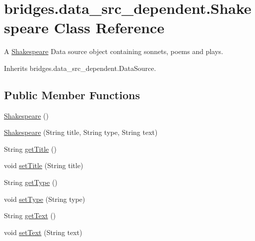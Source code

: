 \hypertarget{classbridges_1_1data__src__dependent_1_1_shakespeare}{}\section{bridges.\+data\+\_\+src\+\_\+dependent.\+Shakespeare Class Reference}
\label{classbridges_1_1data__src__dependent_1_1_shakespeare}


A \mbox{\hyperlink{classbridges_1_1data__src__dependent_1_1_shakespeare}{Shakespeare}} Data source object containing sonnets, poems and plays.  




Inherits bridges.\+data\+\_\+src\+\_\+dependent.\+Data\+Source.

\subsection*{Public Member Functions}
\begin{DoxyCompactItemize}
\item 
\mbox{\hyperlink{classbridges_1_1data__src__dependent_1_1_shakespeare_a34d92b817c4073000de003362e3003fa}{Shakespeare}} ()
\item 
\mbox{\hyperlink{classbridges_1_1data__src__dependent_1_1_shakespeare_aa5a5390d6f7afe3d63f4ad7f9779f9e9}{Shakespeare}} (String title, String type, String text)
\item 
String \mbox{\hyperlink{classbridges_1_1data__src__dependent_1_1_shakespeare_a0f045c5d1140414b7ad6ad5511e6e79c}{get\+Title}} ()
\item 
void \mbox{\hyperlink{classbridges_1_1data__src__dependent_1_1_shakespeare_a2687017aca35bb26b148f784a0bff732}{set\+Title}} (String title)
\item 
String \mbox{\hyperlink{classbridges_1_1data__src__dependent_1_1_shakespeare_adbbb48b9e2564ae910e0313dd88542fd}{get\+Type}} ()
\item 
void \mbox{\hyperlink{classbridges_1_1data__src__dependent_1_1_shakespeare_afcee18014d5630a0a15701635005bea2}{set\+Type}} (String type)
\item 
String \mbox{\hyperlink{classbridges_1_1data__src__dependent_1_1_shakespeare_a5a5cffa6bf3d35182ba1eed2be19d74d}{get\+Text}} ()
\item 
void \mbox{\hyperlink{classbridges_1_1data__src__dependent_1_1_shakespeare_aa2ae0bee864990ae11950039636e52b1}{set\+Text}} (String text)
\end{DoxyCompactItemize}


